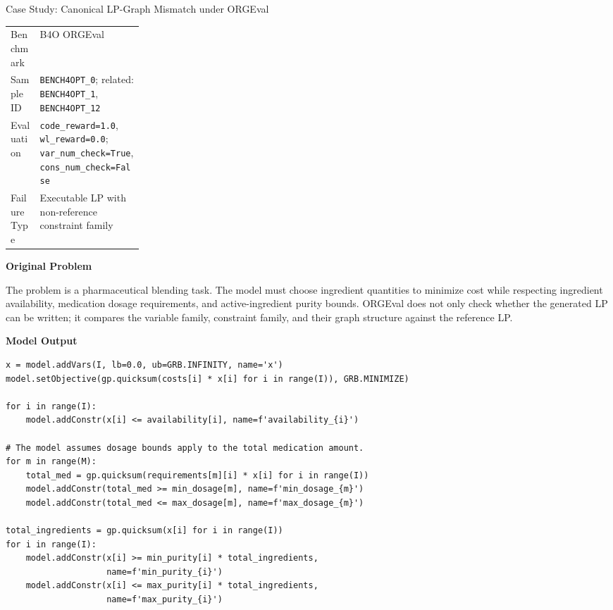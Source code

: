 \vspace{1em}
\begin{casepagestart}{Case Study: Canonical LP-Graph Mismatch under ORGEval}

\begin{tabularx}{\linewidth}{@{}p{0.22\linewidth}X@{}}
\toprule
Benchmark & B4O ORGEval \\
Sample ID & \texttt{BENCH4OPT\_0}; related: \texttt{BENCH4OPT\_1}, \texttt{BENCH4OPT\_12} \\
Evaluation & \texttt{code\_reward=1.0}, \texttt{wl\_reward=0.0}; \texttt{var\_num\_check=True}, \texttt{cons\_num\_check=False} \\
Failure Type & Executable LP with non-reference constraint family \\
\bottomrule
\end{tabularx}

\vspace{0.5em}
\textbf{Original Problem}

{\small
The problem is a pharmaceutical blending task. The model must choose
ingredient quantities to minimize cost while respecting ingredient
availability, medication dosage requirements, and active-ingredient purity
bounds. ORGEval does not only check whether the generated LP can be written;
it compares the variable family, constraint family, and their graph structure
against the reference LP.
\par}

\vspace{0.5em}
\textbf{Model Output}

\begin{lstlisting}[style=pythoncase]
x = model.addVars(I, lb=0.0, ub=GRB.INFINITY, name='x')
model.setObjective(gp.quicksum(costs[i] * x[i] for i in range(I)), GRB.MINIMIZE)

for i in range(I):
    model.addConstr(x[i] <= availability[i], name=f'availability_{i}')

# The model assumes dosage bounds apply to the total medication amount.
for m in range(M):
    total_med = gp.quicksum(requirements[m][i] * x[i] for i in range(I))
    model.addConstr(total_med >= min_dosage[m], name=f'min_dosage_{m}')
    model.addConstr(total_med <= max_dosage[m], name=f'max_dosage_{m}')

total_ingredients = gp.quicksum(x[i] for i in range(I))
for i in range(I):
    model.addConstr(x[i] >= min_purity[i] * total_ingredients,
                    name=f'min_purity_{i}')
    model.addConstr(x[i] <= max_purity[i] * total_ingredients,
                    name=f'max_purity_{i}')
\end{lstlisting}


\end{casepagestart}
